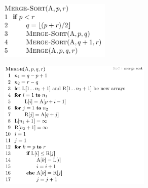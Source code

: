 \documentclass[12pt]{report}
\begin{document}
\vspace{\baselineskip}
\begin{multicols}{2}



\begin{figure}[H]
	\begin{Center}
		\includegraphics[width=2.07in,height=1.08in]{./media/image23.png}
	\end{Center}
\end{figure}



\par


\vspace{\baselineskip}

\vspace{\baselineskip}



\begin{figure}[H]
	\begin{Center}
		\includegraphics[width=2.88in,height=2.42in]{./media/image24.png}
	\end{Center}
\end{figure}




\end{multicols}
\par
\end{document}
